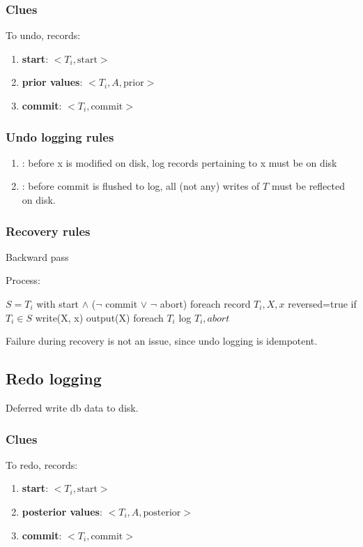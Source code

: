 \documentclass[a4paper]{report}
\begin{document}
\subsubsection{Clues}
To undo, records: 
\begin{enumerate}
\item \textbf{start}: $<T_i, \text{start}>$
\item \textbf{prior values}: $<T_i, A, \text{prior}>$
\item \textbf{commit}: $<T_i, \text{commit}>$
\end{enumerate}

\subsubsection{Undo logging rules}
\begin{enumerate}
\item {}: before x is modified on disk, log records pertaining to x must be on disk
\item {}: before commit is flushed to log, all (not any) writes of $T$ must be reflected on disk.
\end{enumerate}

\newpage
\subsubsection{Recovery rules}
Backward pass

Process:
\begin{pseudo}
$S = T_i$ with start $\wedge$ ($\neg$ commit $\vee$ $\neg$ abort)
foreach record $T_i, X, x$ reversed=true
  if $T_i \in S$
    write(X, x) 
    output(X)
foreach $T_i$
  log $T_i, abort$
\end{pseudo}
Failure during recovery is not an issue, since undo logging is idempotent.



\subsection{Redo logging}
Deferred write db data to disk. 
\subsubsection{Clues}
To redo, records: 
\begin{enumerate}
\item \textbf{start}: $<T_i, \text{start}>$
\item \textbf{posterior values}: $<T_i, A, \text{posterior}>$
\item \textbf{commit}: $<T_i, \text{commit}>$
\end{enumerate}
\end{document}
